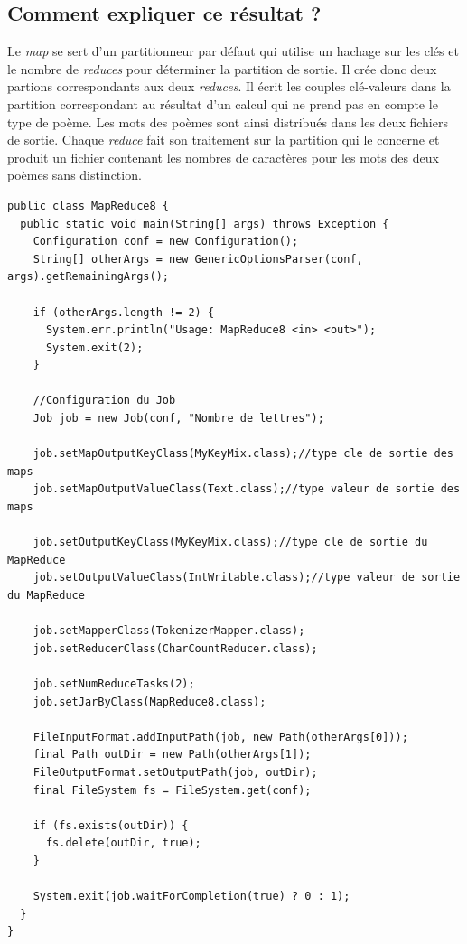 \documentclass{article}
\begin{document}
    \subsection*{Comment expliquer ce résultat ?}

      Le {\it map} se sert d'un partitionneur par défaut qui utilise un hachage
      sur les clés et le nombre de {\it reduces} pour déterminer la partition de
      sortie. Il crée donc deux partions correspondants aux deux {\it
        reduces}. Il écrit les couples clé-valeurs dans la partition
      correspondant au résultat d'un calcul qui ne prend pas en compte le type
      de poème. Les mots des poèmes sont ainsi distribués dans les deux fichiers
      de sortie. Chaque {\it reduce} fait son traitement sur la partition qui le
      concerne et produit un fichier contenant les nombres de caractères pour
      les mots des deux poèmes sans distinction. \medskip

\begin{lstlisting}
public class MapReduce8 {
  public static void main(String[] args) throws Exception {	  
    Configuration conf = new Configuration();
    String[] otherArgs = new GenericOptionsParser(conf, args).getRemainingArgs();
		
    if (otherArgs.length != 2) {
      System.err.println("Usage: MapReduce8 <in> <out>");
      System.exit(2);
    }

    //Configuration du Job
    Job job = new Job(conf, "Nombre de lettres");
		
    job.setMapOutputKeyClass(MyKeyMix.class);//type cle de sortie des maps
    job.setMapOutputValueClass(Text.class);//type valeur de sortie des maps
		
    job.setOutputKeyClass(MyKeyMix.class);//type cle de sortie du MapReduce
    job.setOutputValueClass(IntWritable.class);//type valeur de sortie du MapReduce

    job.setMapperClass(TokenizerMapper.class);
    job.setReducerClass(CharCountReducer.class);
		
    job.setNumReduceTasks(2);
    job.setJarByClass(MapReduce8.class); 
    
    FileInputFormat.addInputPath(job, new Path(otherArgs[0]));
    final Path outDir = new Path(otherArgs[1]);
    FileOutputFormat.setOutputPath(job, outDir);
    final FileSystem fs = FileSystem.get(conf);
    
    if (fs.exists(outDir)) {
      fs.delete(outDir, true);
    }
	   
    System.exit(job.waitForCompletion(true) ? 0 : 1);
  }
}
\end{lstlisting}
\end{document}
